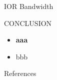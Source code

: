 \documentclass[final]{beamer}
\newlength{\sepwidth}
\newlength{\colwidth}
\newcommand{\separatorcolumn}{\begin{column}{\sepwidth}\end{column}}
\begin{document}
\begin{frame}[t, fragile]
\begin{columns}[t]
\begin{column}{\colwidth}
\begin{block}{IOR Bandwidth}
 
  \end{block}

\begin{block}{CONCLUSION} 
    \begin{itemize}
      \item \textbf{aaa}
      \item bbb
    \end{itemize}

\end{block}


\begin{block}{References} 
\nocite{*}
\tiny{}
\end{block}

  
\end{column}

\separatorcolumn
\end{columns}
\end{frame}
\end{document}
